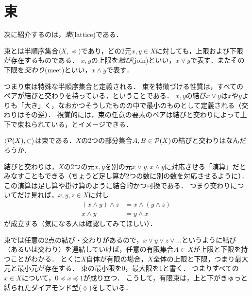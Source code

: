 \documentclass[11pt,a4paper]{jsarticle}
\begin{document}
\section{束}

次に紹介するのは，\emph{束}(lattice)である．

\begin{dfn}[束]
束とは半順序集合$\langle X, \preceq \rangle$であり，どの2元$x, y \in X$に対しても，上限および下限が存在するものである．
$x, y$の上限を\emph{結び}(join)といい，$x \vee y$で表す．またその下限を\emph{交わり}(meet)といい，$x \wedge y$で表す．
\end{dfn}

つまり束は特殊な半順序集合と定義される．
束を特徴づける性質は，すべてのペアが結びと交わりを持っている，ということである．
$x,y$の結び$x \vee y$は$x$や$y$よりも「大き」く，なおかつそうしたものの中で最小のものとして定義される（交わりはその逆）．
視覚的には，束の任意の要素のペアは結びと交わりによって上下で束ねられている，とイメージできる．

\begin{exercise}
 $\langle \mathcal{P}(X), \subset \rangle$は束である．$X$の2つの部分集合$A, B \in \mathcal{P}(X)$の結びと交わりはなんだろうか．
\end{exercise}

結びと交わりは，$X$の2つの元$x,y$を別の元$x \vee y, x \wedge y$に対応させる「演算」だとみなすこともできる（ちょうど足し算が2つの数に別の数を対応させるように）．
この演算は足し算や掛け算のように結合的かつ可換である．
つまり交わりについてだけ見れば，$x, y, z \in X$に対し
\begin{align}
(x \wedge y) \wedge z &= x \wedge (y \wedge z) \\
x \wedge y &= y \wedge x
\end{align}
が成立する（気になる人は確認してみてほしい）．


束では任意の2点の結び・交わりがあるので，$x \vee y \vee z \vee \dots$というように結び（あるいは交わり）を連結していけば，任意の有限集合$A \subset X$が上限と下限を持つことがわかる．
とくに$X$自体が有限の場合，$X$全体の上限と下限，つまり最大元と最小元が存在する．
束の最小限を0，最大限を1と書く．
つまりすべての$x \in X$について，$0 \preceq x \preceq 1$が成り立つ．
こうして，有限束は，上と下がきゅっと縛られたダイアモンド型($\lozenge$)をしている．
\end{document}
